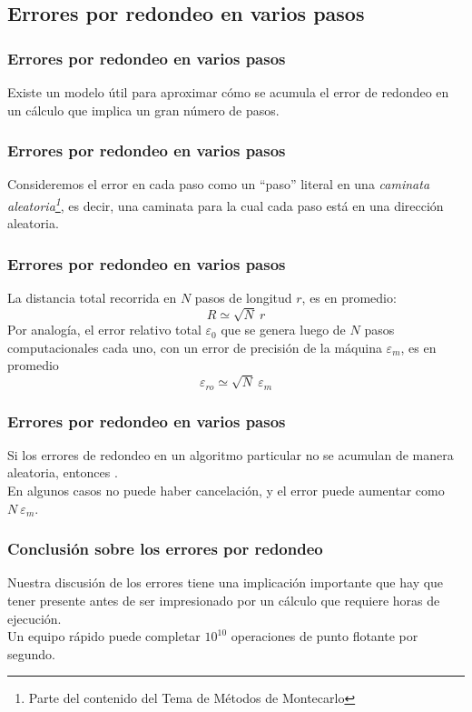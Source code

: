\subsection{Errores por redondeo en varios pasos}
\begin{frame}
\frametitle{Errores por redondeo en varios pasos}
Existe un modelo útil para aproximar cómo se acumula el error de redondeo en un cálculo que implica un gran número de pasos.
\end{frame}
\begin{frame}
\frametitle{Errores por redondeo en varios pasos}
Consideremos el error en cada paso como un \enquote{paso} literal en una \emph{caminata aleatoria\footnote{Parte del contenido del Tema de Métodos de Montecarlo}}, es decir, una caminata para la cual cada paso está en una dirección aleatoria.
\end{frame}
\begin{frame}
\frametitle{Errores por redondeo en varios pasos}
La distancia total recorrida en $N$ pasos de longitud $r$, es en promedio:
\begin{equation}
R \simeq \sqrt{N} \: r
\label{eq:ecuacion_02_17}
\end{equation}
\pause
Por analogía, el error relativo total $\varepsilon_{0}$ que se genera luego de $N$ pasos computacionales cada uno, con un error de precisión de la máquina $\varepsilon_{m}$, es en promedio
\begin{equation}
\varepsilon_{ro} \simeq \sqrt{N} \: \varepsilon_{m}
\label{eq:ecuacion_02_18}
\end{equation}
\end{frame}
\begin{frame}
\frametitle{Errores por redondeo en varios pasos}
Si los errores de redondeo en un algoritmo particular no se acumulan de manera aleatoria, entonces .
\\
\bigskip
En algunos casos no puede haber cancelación, y el error puede aumentar como $N \: \varepsilon_{m}$.
\end{frame}
\begin{frame}
\frametitle{Conclusión sobre los errores por redondeo}
Nuestra discusión de los errores tiene una implicación importante que hay que tener presente antes de ser impresionado por un cálculo que requiere horas de ejecución.
\\
\bigskip
\pause
Un equipo rápido puede completar $10^{10}$ operaciones de punto flotante por segundo.
\end{frame}
